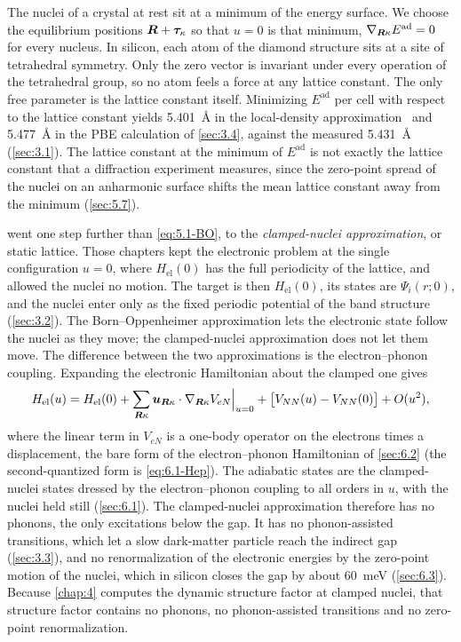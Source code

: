 The nuclei of a crystal at rest sit at a minimum of the energy surface. We choose the equilibrium positions $\bm{R} + \bm{\tau}_\kappa$ so that $u = 0$ is that minimum, $\nabla_{\bm{R}\kappa}E^{\mathrm{ad}} = 0$ for every nucleus. In silicon, each atom of the diamond structure sits at a site of tetrahedral symmetry. Only the zero vector is invariant under every operation of the tetrahedral group, so no atom feels a force at any lattice constant. The only free parameter is the lattice constant itself. Minimizing $E^{\mathrm{ad}}$ per cell with respect to the lattice constant yields \SI{5.401}{\angstrom} in the local-density approximation~\cite[Sect.~10.2]{ponce2016epw} and \SI{5.477}{\angstrom} in the PBE calculation of \cref{sec:3.4}, against the measured \SI{5.431}{\angstrom} (\cref{sec:3.1}). The lattice constant at the minimum of $E^{\mathrm{ad}}$ is not exactly the lattice constant that a diffraction experiment measures, since the zero-point spread of the nuclei on an anharmonic surface shifts the mean lattice constant away from the minimum (\cref{sec:5.7}).

 went one step further than \cref{eq:5.1-BO}, to the \emph{clamped-nuclei approximation}, or static lattice. Those chapters kept the electronic problem at the single configuration $u = 0$, where $H_{\mathrm{el}}(0)$ has the full periodicity of the lattice, and allowed the nuclei no motion. The target is then $H_{\mathrm{el}}(0)$, its states are $\Psi_i(r;0)$, and the nuclei enter only as the fixed periodic potential of the band structure (\cref{sec:3.2}). The Born--Oppenheimer approximation lets the electronic state follow the nuclei as they move; the clamped-nuclei approximation does not let them move. The difference between the two approximations is the electron--phonon coupling. Expanding the electronic Hamiltonian about the clamped one gives
\begin{equation}
  H_{\mathrm{el}}(u) = H_{\mathrm{el}}(0) + \sum_{\bm{R}\kappa}\bm{u}_{\bm{R}\kappa}\cdot\nabla_{\bm{R}\kappa}V_{eN}\Big|_{u=0} + \bigl[V_{NN}(u) - V_{NN}(0)\bigr] + O(u^2) ,
  \label{eq:5.1-expand}
\end{equation}
where the linear term in $V_{eN}$ is a one-body operator on the electrons times a displacement, the bare form of the electron--phonon Hamiltonian of \cref{sec:6.2} (the second-quantized form is \cref{eq:6.1-Hep}). The adiabatic states are the clamped-nuclei states dressed by the electron--phonon coupling to all orders in $u$, with the nuclei held still (\cref{sec:6.1}). The clamped-nuclei approximation therefore has no phonons, the only excitations below the gap. It has no phonon-assisted transitions, which let a slow dark-matter particle reach the indirect gap (\cref{sec:3.3}), and no renormalization of the electronic energies by the zero-point motion of the nuclei, which in silicon closes the gap by about \SI{60}{meV} (\cref{sec:6.3}). Because \cref{chap:4} computes the dynamic structure factor at clamped nuclei, that structure factor contains no phonons, no phonon-assisted transitions and no zero-point renormalization.

